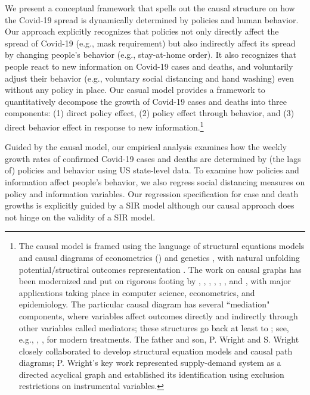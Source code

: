 \documentclass[11pt,reqno,letter]{amsart}
\theoremstyle{definition}
\begin{document}
We present a conceptual framework that spells out the causal structure on how the Covid-19 spread is dynamically determined by policies and human behavior. Our approach explicitly recognizes that policies not only directly affect the spread of Covid-19 (e.g., mask requirement) but also indirectly affect its spread by changing people's behavior (e.g., stay-at-home order). It also recognizes that people react to new information on Covid-19 cases and deaths, and voluntarily adjust their behavior (e.g., voluntary social distancing and hand washing) even without any policy in place. Our casual model provides a framework to quantitatively decompose the growth of Covid-19 cases and deaths into three components: (1) direct policy effect, (2) policy effect through behavior, and (3) direct behavior effect in response to new information.\footnote{The causal model is framed using the language of structural equations models and causal diagrams of econometrics (\cite{pwright, haavelmo:1944, tinbergen:1940, wold:1954, pearl:biometrika, heckman:pinto}) and genetics \citep{wright1923}, with natural unfolding potential/structiral outcomes representation \citep{rubin1974,tinbergen1930,neyman:PO,imbens_rubin_2015}. The work on causal graphs has been modernized and put on rigorous footing by  \cite{pearl:biometrika}, \cite{pearl:robins}, \cite{pearl:causality}, \cite{pearl:why}, \cite{white:chalak}, \cite{peters2020book}, and \cite{hernanrobins2020book}, with major applications taking place in computer science, econometrics, and epidemiology. The particular causal diagram has several ``mediation" components, where variables affect outcomes directly and indirectly through other variables called mediators; these structures go back at least to \citet[][see Figure 6]{wright1923}; see, e.g., \cite{baron1986}, \cite{Hines2020}, \cite{richardson:mediation} for modern treatments. The father and son, P. Wright and S. Wright closely collaborated to develop structural equation models and causal path diagrams; P. Wright's key work represented supply-demand system as a directed acyclical graph and established its identification using exclusion restrictions on instrumental variables.}



Guided by the causal model, our empirical analysis examines how the weekly growth rates of confirmed Covid-19 cases and deaths are determined by (the lags of) policies and behavior using US state-level data. To examine how policies and information affect people's behavior, we also regress social distancing measures  on policy and information variables. Our regression specification for case and death growths is explicitly guided by a SIR model although  our causal approach does not hinge on the validity of a SIR model.
\end{document}
